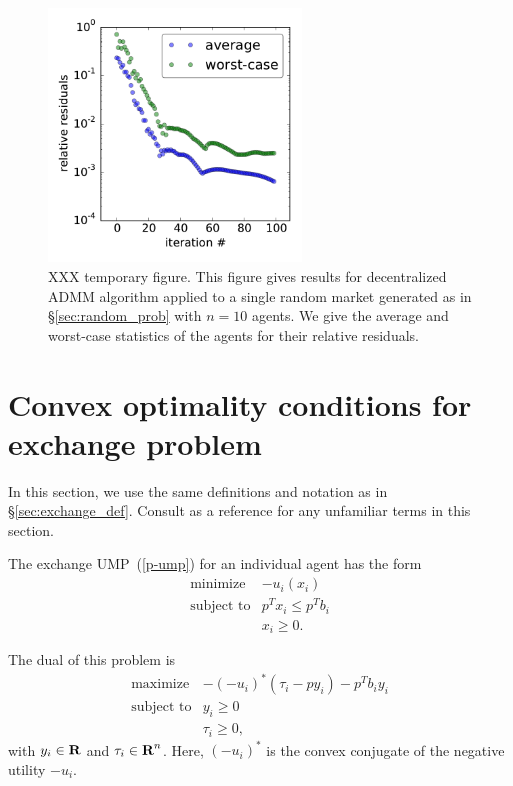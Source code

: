\documentclass[12pt]{article}
\begin{document}
\begin{figure}
\begin{center}
\includegraphics[width=0.6\textwidth]{figures/admm}
\end{center}
\caption{XXX temporary figure. This figure gives results for decentralized ADMM algorithm applied to a single random market generated as in \S\ref{sec:random_prob} with $n=10$ agents. We give the average and worst-case statistics of the agents for their relative residuals.}
\label{f-admm}
\end{figure}


\appendix


\section{Convex optimality conditions for exchange problem}
\label{sec:exchange_proof}
In this section, we use the same definitions and notation as in \S\ref{sec:exchange_def}.
Consult \cite{BoV:04} as a reference for any unfamiliar terms in this section.

The exchange UMP~(\ref{p-ump}) for an individual agent has the form
\[
\begin{array}{ll}
\mbox{minimize} & - u_i(x_i)\\
\mbox{subject to} & p^T x_i \leq p^T b_i\\
& x_i \geq 0.
\end{array}
\]

The dual of this problem is
\[
\begin{array}{ll}
\mbox{maximize} & -(- u_i)^*(\tau_i - p y_i) - p^T b_i y_i\\
\mbox{subject to} & y_i \geq 0\\
& \tau_i \geq 0,
\end{array}
\]
with $y_i \in {\mbox{\bf R}}$ and $\tau_i \in {\mbox{\bf R}}^n$. Here, $(- u_i)^*$
is the convex conjugate of the negative utility $-u_i$.
\end{document}
